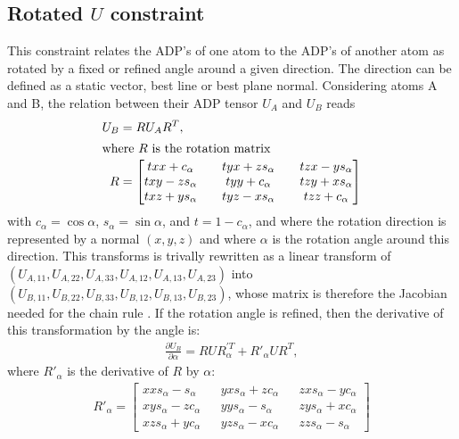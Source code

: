 \documentclass[pdf]{iucr}
\newcommand{\partialder}[2]{\frac{\partial #1}{\partial #2}}
\begin{document}
\subsection{Rotated $U$ constraint}
This constraint relates the ADP's of one atom to the ADP's of another atom as rotated by a fixed or refined angle around a given direction. The direction can be defined as a static vector, best line or best plane normal. Considering atoms A and B, the relation between their ADP tensor $U_A$ and $U_B$ reads
\begin{align}
U_{B} &= RU_{A}R^{T}, \\
\shortintertext{where $R$ is the rotation matrix}
R &=
  \begin{bmatrix} 
    txx + c_\alpha && tyx + zs_\alpha && tzx - ys_\alpha \\
    txy - zs_\alpha && tyy + c_\alpha && tzy + xs_\alpha \\
    txz + ys_\alpha && tyz - xs_\alpha && tzz + c_\alpha \\
  \end{bmatrix}
  \label{eqn:rotmat}
\end{align}
with $c_\alpha=\cos\alpha$, $s_\alpha=\sin\alpha$, and $t=1-c_\alpha$, and where the rotation direction is represented by a normal $(x,y,z)$ and where $\alpha$ is the rotation angle around this direction. This transforms is trivally rewritten as a linear transform of $(U_{A,11}, U_{A,22}, U_{A,33}, U_{A,12}, U_{A,13}, U_{A,23})$ into $(U_{B,11}, U_{B,22}, U_{B,33}, U_{B,12}, U_{B,13}, U_{B,23})$, whose matrix is therefore the Jacobian needed for the chain rule . If the rotation angle is refined, then the derivative of this transformation by the angle is:
\begin{align}
\partialder{U_{B}}{\alpha} = RUR_\alpha^{\prime T} + R'_\alpha U R^{T},
\end{align}
where $R'_\alpha$ is the derivative of $R$ by $\alpha$:
\begin{align}
R'_\alpha = 
  \begin{bmatrix} 
    xx s_\alpha -  s_\alpha && yx s_\alpha + z c_\alpha && zx s_\alpha - y c_\alpha \\
    xy s_\alpha - z c_\alpha && yy s_\alpha -  s_\alpha && zy s_\alpha + x c_\alpha \\
    xz s_\alpha + y c_\alpha && yz s_\alpha - x c_\alpha && zz s_\alpha - s_\alpha
  \end{bmatrix}
  \label{eqn:rotmatdev}
\end{align}
\end{document}
